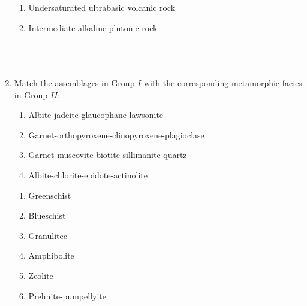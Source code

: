 \documentclass[12pt,fleqn]{article}
\theoremstyle{remark}
\begin{document}
\begin{enumerate}[label=Q.\arabic*.]
\begin{enumerate}
                \item Undersaturated ultrabasic volcanic rock
                \item Intermediate alkaline plutonic rock\\\\\\\\
            \end{enumerate}
\item Match the assemblages in Group $I$ with the corresponding metamorphic facies in Group $II$: \hfill{} \\
    
\begin{multicols}{2}
            \begin{enumerate}[label=(\Alph*),start=16]
                \item Albite-jadeite-glaucophane-lawsonite
                \item Garnet-orthopyroxene-clinopyroxene-plagioclase
                \item Garnet-muscovite-biotite-sillimanite-quartz
                \item Albite-chlorite-epidote-actinolite
            \end{enumerate}
            
            \columnbreak
            
            \begin{enumerate}[label=\arabic*.]
                \item Greenschist
                \item Blueschist
                \item Granulitec
                \item Amphibolite
                \item Zeolite
                \item Prehnite-pumpellyite
            \end{enumerate}         


        \end{multicols}
            \begin {enumerate}
\end{enumerate}
\end{enumerate}
\end{document}

